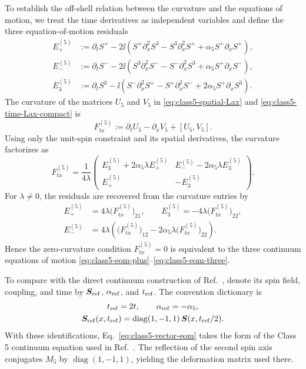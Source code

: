 To establish the off-shell relation between the curvature and the equations
of motion, we treat the time derivatives as independent variables and define
the three equation-of-motion residuals
\begin{align}
E^{(5)}_+
&:=
\partial_t S^+
-2\ii\left(
S^+\partial_x^2S^3
-S^3\partial_x^2S^+
+\alpha_5 S^+\partial_xS^+
\right),
\label{eq:class5-residual-plus}\\
E^{(5)}_-
&:=
\partial_t S^-
-2\ii\left(
S^3\partial_x^2S^-
-S^-\partial_x^2S^3
+\alpha_5 S^+\partial_xS^-
\right),
\label{eq:class5-residual-minus}\\
E^{(5)}_3
&:=
\partial_t S^3
-\ii\left(
S^-\partial_x^2S^+
-S^+\partial_x^2S^-
+2\alpha_5 S^+\partial_xS^3
\right).
\label{eq:class5-residual-three}
\end{align}
The curvature of the matrices $U_5$ and $V_5$ in
\eqref{eq:class5-spatial-Lax} and \eqref{eq:class5-time-Lax-compact} is
\begin{equation}
F^{(5)}_{tx}
:=
\partial_tU_5-\partial_xV_5+[U_5,V_5].
\label{eq:class5-curvature-definition}
\end{equation}
Using only the unit-spin constraint and its spatial derivatives, the curvature
factorizes as
\begin{equation}
F^{(5)}_{tx}
=
\frac{1}{4\lambda}
\begin{pmatrix}
E^{(5)}_3+2\alpha_5\lambda E^{(5)}_+
&
E^{(5)}_- -2\alpha_5\lambda E^{(5)}_3\\
E^{(5)}_+
&
-E^{(5)}_3
\end{pmatrix}.
\label{eq:class5-offshell-factorization}
\end{equation}
For $\lambda\neq0$, the residuals are recovered from the curvature entries by
\begin{align}
E^{(5)}_+&=4\lambda\bigl(F^{(5)}_{tx}\bigr)_{21},
\qquad
E^{(5)}_3=-4\lambda\bigl(F^{(5)}_{tx}\bigr)_{22},
\nonumber\\
E^{(5)}_-&=4\lambda\left(
\bigl(F^{(5)}_{tx}\bigr)_{12}
-2\alpha_5\lambda\bigl(F^{(5)}_{tx}\bigr)_{22}
\right).
\label{eq:class5-residuals-from-curvature}
\end{align}
Hence the zero-curvature condition $F^{(5)}_{tx}=0$ is equivalent to the
three continuum equations of motion
\eqref{eq:class5-eom-plus}--\eqref{eq:class5-eom-three}.

To compare with the direct continuum construction of
Ref.~\cite{deLeeuwFontanellaNietoGarcia2026}, denote its spin field, coupling,
and time by $\boldsymbol S_{\rm ref}$, $\alpha_{\rm ref}$, and
$t_{\rm ref}$.  The convention dictionary is
\begin{equation}
\begin{gathered}
t_{\rm ref}=2t,
\qquad \alpha_{\rm ref}=-\alpha_5,\\
\boldsymbol S_{\rm ref}(x,t_{\rm ref})
=\operatorname{diag}(1,-1,1)\,
\boldsymbol S(x,t_{\rm ref}/2).
\end{gathered}
\label{eq:class5-reference-convention-change}
\end{equation}
With these identifications, Eq.~\eqref{eq:class5-vector-eom} takes the form of
the Class 5 continuum equation used in
Ref.~\cite{deLeeuwFontanellaNietoGarcia2026}.  The reflection of the second
spin axis conjugates $M_5$ by $\operatorname{diag}(1,-1,1)$, yielding the
deformation matrix used there.
